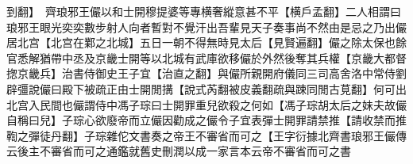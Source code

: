 到翻】　齊琅邪王儼以和士開穆提婆等專横奢縱意甚不平【横戶孟翻】二人相謂曰琅邪王眼光奕奕數步射人向者暫對不覺汗出吾輩見天子奏事尚不然由是忌之乃出儼居北宫【北宫在鄴之北城】五日一朝不得無時見太后【見賢遍翻】儼之除太保也餘官悉解猶帶中丞及京畿士開等以北城有武庫欲移儼於外然後奪其兵權【京畿大都督揔京畿兵】治書侍御史王子宜【治直之翻】與儼所親開府儀同三司高舍洛中常侍劉辟彊說儼曰殿下被疏正由士開閒搆【說式芮翻被皮義翻疏與踈同閒古莧翻】何可出北宫入民間也儼謂侍中馮子琮曰士開罪重兒欲殺之何如【馮子琮胡太后之妹夫故儼自稱曰兒】子琮心欲廢帝而立儼因勸成之儼令子宜表彈士開罪請禁推【請收禁而推鞫之彈徒丹翻】子琮雜佗文書奏之帝王不審省而可之【王字衍據北齊書琅邪王儼傳云後主不審省而可之通鑑就舊史刪潤以成一家言本云帝不審省而可之書